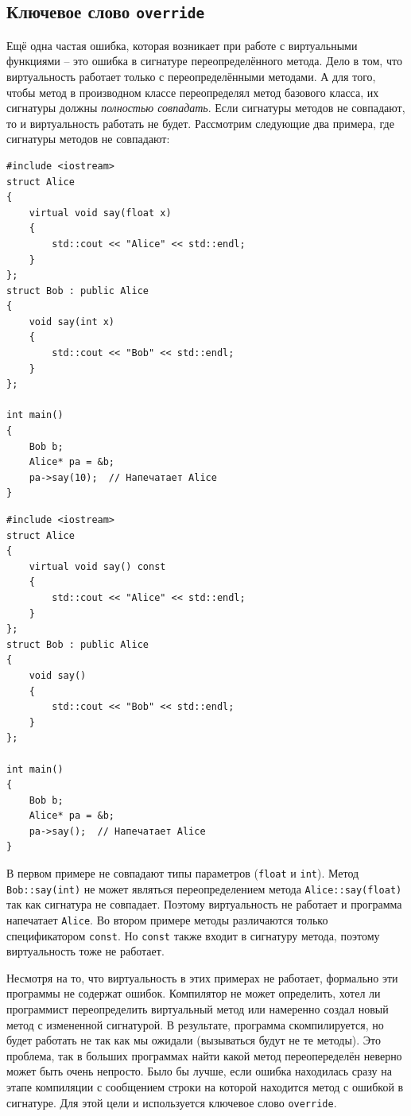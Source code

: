 \documentclass{article}
\begin{document}
\subsection*{Ключевое слово \texttt{override}}
Ещё одна частая ошибка, которая возникает при работе с виртуальными функциями -- это ошибка в сигнатуре переопределённого метода. Дело в том, что виртуальность работает только с переопределёнными методами. А для того, чтобы метод в производном классе переопределял метод базового класса, их сигнатуры должны \textit{полностью совпадать}. Если сигнатуры методов не совпадают, то и виртуальность работать не будет. Рассмотрим следующие два примера, где сигнатуры методов не совпадают:

\begin{minipage}{0.5\textwidth}
\begin{lstlisting}[style=csMiptCppBorderStyle]
#include <iostream>
struct Alice 
{
    virtual void say(float x) 
    {
    	std::cout << "Alice" << std::endl;
    }
};
struct Bob : public Alice 
{
    void say(int x) 
    {
    	std::cout << "Bob" << std::endl;
    }
};

int main() 
{
    Bob b;
	Alice* pa = &b;
    pa->say(10);  // Напечатает Alice
}
\end{lstlisting}
\end{minipage}
\begin{minipage}{0.5\textwidth}
\begin{lstlisting}[style=csMiptCppBorderStyle]
#include <iostream>
struct Alice 
{
    virtual void say() const
    {
    	std::cout << "Alice" << std::endl;
    }
};
struct Bob : public Alice 
{
    void say() 
    {
    	std::cout << "Bob" << std::endl;
    }
};

int main() 
{
    Bob b;
	Alice* pa = &b;
    pa->say();  // Напечатает Alice
}
\end{lstlisting}
\end{minipage}
В первом примере не совпадают типы параметров (\texttt{float} и \texttt{int}). Метод \texttt{Bob::say(int)} не может являться переопределением метода \texttt{Alice::say(float)} так как сигнатура не совпадает. Поэтому виртуальность не работает и программа напечатает \texttt{Alice}. Во втором примере методы различаются только спецификатором \texttt{const}. Но \texttt{const} также входит в сигнатуру метода, поэтому виртуальность тоже не работает.

Несмотря на то, что виртуальность в этих примерах не работает, формально эти программы не содержат ошибок. Компилятор не может определить, хотел ли программист переопределить виртуальный метод или намеренно создал новый метод с измененной сигнатурой. В результате, программа скомпилируется, но будет работать не так как мы ожидали (вызываться будут не те методы). Это проблема, так в больших программах найти какой метод переопеределён неверно может быть очень непросто.
Было бы лучше, если ошибка находилась сразу на этапе компиляции с сообщением строки на которой находится метод с ошибкой в сигнатуре. Для этой цели и используется ключевое слово \texttt{override}.
\end{document}
